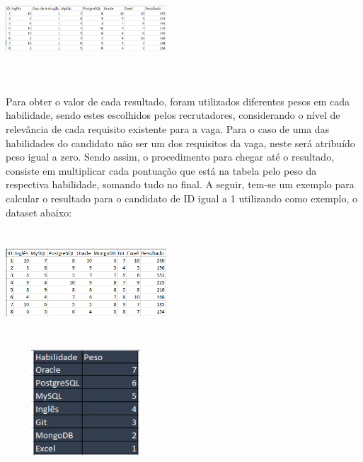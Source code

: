 \documentclass[conference]{IEEEtran}
\begin{document}
\vspace{7mm}
\centerline{\includegraphics[width=60mm,height=40mm,keepaspectratio]{Tabela3.png}}
\vspace{7mm}

Para obter o valor de cada resultado, foram utilizados diferentes pesos em cada habilidade, sendo estes escolhidos pelos recrutadores, considerando o nível de relevância de cada requisito existente para a vaga. Para o caso de uma das habilidades do candidato não ser um dos requisitos da vaga, neste será atribuído peso igual a zero. Sendo assim, o procedimento para chegar até o resultado, consiste em multiplicar cada pontuação que está na tabela pelo peso da respectiva habilidade, somando tudo no final. A seguir, tem-se um exemplo para calcular o resultado para o candidato de ID igual a 1 utilizando como exemplo, o dataset abaixo:

\vspace{7mm}
\centerline{\includegraphics[width=60mm,height=40mm,keepaspectratio]{Tabela7.png}}
\vspace{7mm}

\vspace{7mm}
\centerline{\includegraphics[width=60mm,height=40mm,keepaspectratio]{Tabela4.png}}
\vspace{7mm}
\end{document}
